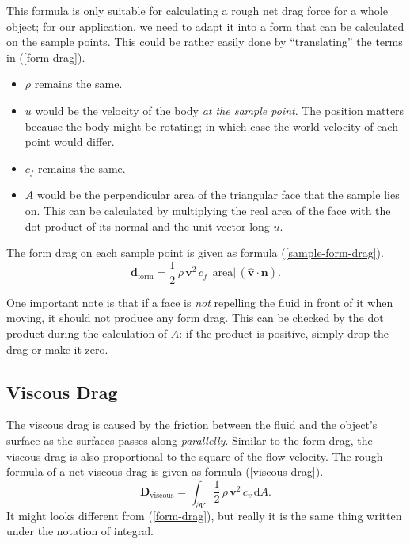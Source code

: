 This formula is only suitable for calculating a rough net drag force for a whole object;
for our application, we need to adapt it into a form that can be calculated on the sample points.
This could be rather easily done by ``translating'' the terms in (\ref{form-drag}).
\begin{itemize}
	\item $\rho$ remains the same.
	\item $u$ would be the velocity of the body \emph{at the sample point}.
		The position matters because the body might be rotating; in which case the world velocity of each point would differ.
	\item $c_f$ remains the same.
	\item $A$ would be the perpendicular area of the triangular face that the sample lies on.
		This can be calculated by multiplying the real area of the face with the dot product of its normal and the unit vector long $u$.
\end{itemize}

The form drag on each sample point is given as formula (\ref{sample-form-drag}).
\begin{equation}
	\mathbf{d}_{\text{form}}=\frac{1}{2}\,\rho\,\mathbf{v}^2\,c_f\,|\text{area}|\,(\hat{\mathbf{v}}\cdot\mathbf{n}).
	\label{sample-form-drag}
\end{equation}

One important note is that if a face is \emph{not} repelling the fluid in front of it when moving, it should not produce any form drag.
This can be checked by the dot product during the calculation of $A$: if the product is positive, simply drop the drag or make it zero.

\subsection{Viscous Drag}

The viscous drag is caused by the friction between the fluid and the object's surface as the surfaces passes along \emph{parallelly}.
Similar to the form drag, the viscous drag is also proportional to the square of the flow velocity.
The rough formula of a net viscous drag is given as formula (\ref{viscous-drag}).
\begin{equation}
	\mathbf{D}_{\text{viscous}}=\int_{\partial V}\frac{1}{2}\,\rho\,\mathbf{v}^2\,c_v\,\text{d}A.
	\label{viscous-drag}
\end{equation}
It might looks different from (\ref{form-drag}), but really it is the same thing written under the notation of integral.

